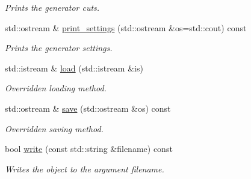 \begin{DoxyCompactItemize}
\begin{DoxyCompactList}\small\item\em Prints the generator cuts. \end{DoxyCompactList}\item 
\hypertarget{a00210_a497a6bcd40e63046684035f933e66146}{std\-::ostream \& \hyperlink{a00210_a497a6bcd40e63046684035f933e66146}{print\-\_\-settings} (std\-::ostream \&os=std\-::cout) const }\label{a00210_a497a6bcd40e63046684035f933e66146}

\begin{DoxyCompactList}\small\item\em Prints the generator settings. \end{DoxyCompactList}\item 
\hypertarget{a00210_a24f39c28eb3e370bee16d338a7f7fb1c}{std\-::istream \& \hyperlink{a00210_a24f39c28eb3e370bee16d338a7f7fb1c}{load} (std\-::istream \&is)}\label{a00210_a24f39c28eb3e370bee16d338a7f7fb1c}

\begin{DoxyCompactList}\small\item\em Overridden loading method. \end{DoxyCompactList}\item 
\hypertarget{a00210_a544789ebcd8e55b4d3e28cd94dd34609}{std\-::ostream \& \hyperlink{a00210_a544789ebcd8e55b4d3e28cd94dd34609}{save} (std\-::ostream \&os) const }\label{a00210_a544789ebcd8e55b4d3e28cd94dd34609}

\begin{DoxyCompactList}\small\item\em Overridden saving method. \end{DoxyCompactList}\item 
\hypertarget{a00210_aeb2d89e80de9904cb93144677c200432}{bool \hyperlink{a00210_aeb2d89e80de9904cb93144677c200432}{write} (const std\-::string \&filename) const }\label{a00210_aeb2d89e80de9904cb93144677c200432}

\begin{DoxyCompactList}\small\item\em Writes the object to the argument filename. \end{DoxyCompactList}\end{DoxyCompactItemize}
